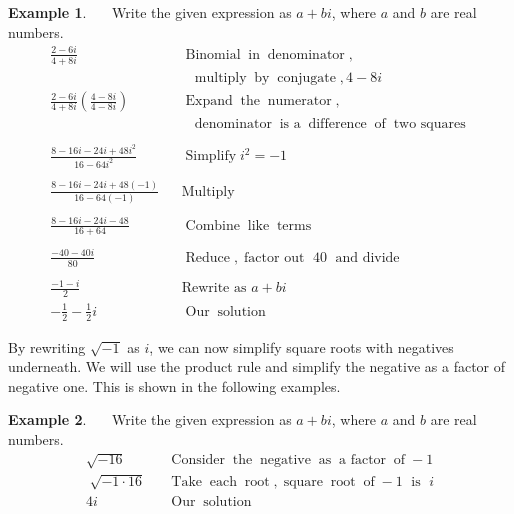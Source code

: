 \documentclass[12pt]{book}
\theoremstyle{definition}
\newtheorem{example}{Example}
\newcommand{\tmop}[1]{\ensuremath{\operatorname{#1}}}
\begin{document}
\begin{example}~~~Write the given expression as $a+bi$, where $a$ and $b$ are real numbers.
  \begin{eqnarray*}
    \frac{2 - 6 i}{4 + 8 i} &  & \tmop{Binomial} \tmop{in} \tmop{denominator},\\
    & & ~~~\tmop{multiply} \tmop{by} \tmop{conjugate}, 4 - 8 i\\
    \frac{2 - 6 i}{4 + 8 i} \left( \frac{4 - 8 i}{4 - 8 i} \right) &  &
    \tmop{Expand} \tmop{the} \tmop{numerator},\\
		&&~~~\tmop{denominator} \tmop{is~a}
    \tmop{difference} \tmop{of} \tmop{two~squares}\\
    &  & \\
    \frac{8 - 16 i - 24 i + 48 i^2}{16 - 64 i^2} &  & \tmop{Simplify} i^2 = -
    1\\
    &  & \\
    \frac{8 - 16 i - 24 i + 48 (- 1)}{16 - 64 (- 1)} &  & \tmop{Multiply}\\
    &  & \\
    \frac{8 - 16 i - 24 i - 48}{16 + 64} &  & \tmop{Combine} \tmop{like}
    \tmop{terms}\\
    &  & \\
    \frac{- 40 - 40 i}{80} &  & \tmop{Reduce}, \tmop{factor~out~}40 \tmop{~and~divide}\\
    &  & \\
    \frac{- 1 - i}{2}& &\text{Rewrite as~} a+bi\\
		-\frac{1}{2} - \frac{1}{2}i &  & \tmop{Our} \tmop{solution}
  \end{eqnarray*}
\end{example}
By rewriting $\sqrt{-1}$ as $i$, we can now simplify square roots with negatives underneath. We will use the product rule and simplify the negative as a factor of negative one. This is shown in the following examples.
\begin{example}~~~Write the given expression as $a+bi$, where $a$ and $b$ are real numbers.
  \begin{eqnarray*}
    \sqrt{- 16} &  & \tmop{Consider} \tmop{the} \tmop{negative} \tmop{as} 
    \tmop{a~factor} \tmop{of} - 1\\
    \sqrt[]{- 1 \cdot 16} &  & \tmop{Take} \tmop{each} \tmop{root},
    \tmop{square} \tmop{root} \tmop{of} - 1 \tmop{~is~} i\\
    4 i &  & \tmop{Our} \tmop{solution}
  \end{eqnarray*}
\end{example}
\end{document}
